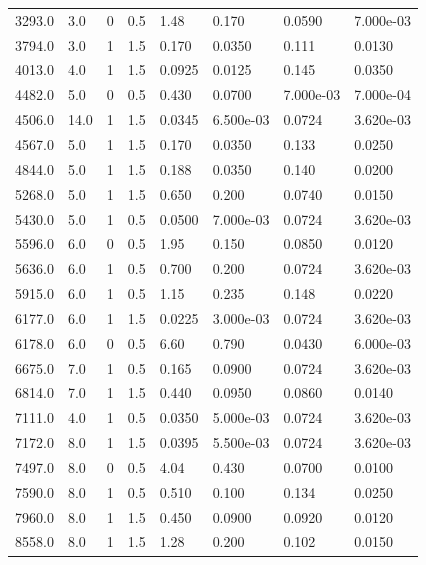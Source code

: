 \documentclass[preview]{standalone}
\begin{document}
{{\begin{tabular}{L{1.2cm}C{1.2cm} C{0.3cm}C{0.5cm} C{1.4cm}C{1.4cm} C{1.4cm}C{1.4cm}}
  3293.0  &   3.0  & 0     & 0.5 &  1.48  & 0.170  & 0.0590 &  7.000e-03   \\ 
  3794.0  &   3.0  & 1     & 1.5 &  0.170  & 0.0350  & 0.111 &  0.0130   \\ 
  4013.0  &   4.0  & 1     & 1.5 &  0.0925  & 0.0125  & 0.145 &  0.0350   \\ 
  4482.0  &   5.0  & 0     & 0.5 &  0.430  & 0.0700  & 7.000e-03 &  7.000e-04   \\ 
  4506.0  &  14.0  & 1     & 1.5 &  0.0345  & 6.500e-03  & 0.0724 &  3.620e-03   \\ 
  4567.0  &   5.0  & 1     & 1.5 &  0.170  & 0.0350  & 0.133 &  0.0250   \\ 
  4844.0  &   5.0  & 1     & 1.5 &  0.188  & 0.0350  & 0.140 &  0.0200   \\ 
  5268.0  &   5.0  & 1     & 1.5 &  0.650  & 0.200  & 0.0740 &  0.0150   \\ 
  5430.0  &   5.0  & 1     & 0.5 &  0.0500  & 7.000e-03  & 0.0724 &  3.620e-03   \\ 
  5596.0  &   6.0  & 0     & 0.5 &  1.95  & 0.150  & 0.0850 &  0.0120   \\ 
  5636.0  &   6.0  & 1     & 0.5 &  0.700  & 0.200  & 0.0724 &  3.620e-03   \\ 
  5915.0  &   6.0  & 1     & 0.5 &  1.15  & 0.235  & 0.148 &  0.0220   \\ 
  6177.0  &   6.0  & 1     & 1.5 &  0.0225  & 3.000e-03  & 0.0724 &  3.620e-03   \\ 
  6178.0  &   6.0  & 0     & 0.5 &  6.60  & 0.790  & 0.0430 &  6.000e-03   \\ 
  6675.0  &   7.0  & 1     & 0.5 &  0.165  & 0.0900  & 0.0724 &  3.620e-03   \\ 
  6814.0  &   7.0  & 1     & 1.5 &  0.440  & 0.0950  & 0.0860 &  0.0140   \\ 
  7111.0  &   4.0  & 1     & 0.5 &  0.0350  & 5.000e-03  & 0.0724 &  3.620e-03   \\ 
  7172.0  &   8.0  & 1     & 1.5 &  0.0395  & 5.500e-03  & 0.0724 &  3.620e-03   \\ 
  7497.0  &   8.0  & 0     & 0.5 &  4.04  & 0.430  & 0.0700 &  0.0100   \\ 
  7590.0  &   8.0  & 1     & 0.5 &  0.510  & 0.100  & 0.134 &  0.0250   \\ 
  7960.0  &   8.0  & 1     & 1.5 &  0.450  & 0.0900  & 0.0920 &  0.0120   \\ 
  8558.0  &   8.0  & 1     & 1.5 &  1.28  & 0.200  & 0.102 &  0.0150   \\ 

\end{tabular}}}
\end{document}
